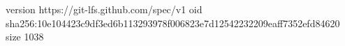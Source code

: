 version https://git-lfs.github.com/spec/v1
oid sha256:10e104423c9df3ed6b113293978f006823e7d12542232209eaff7352efd84620
size 1038
